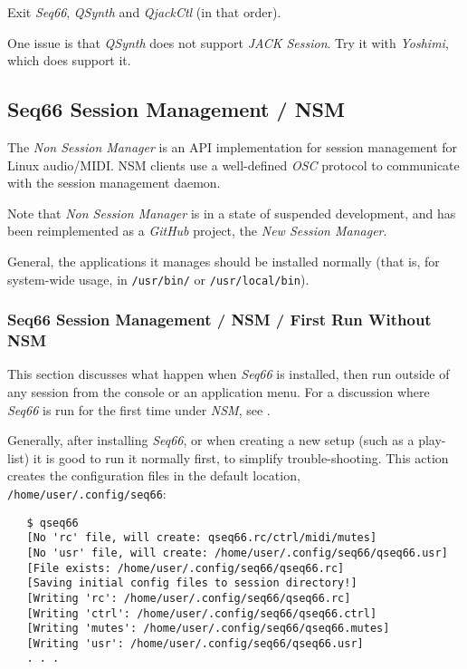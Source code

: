    Exit \textsl{Seq66}, \textsl{QSynth} and \textsl{QjackCtl}
   (in that order).

   One issue is that \textsl{QSynth}
   does not support \textsl{JACK Session}.
   Try it with \textsl{Yoshimi}, which does support it.


\subsection{Seq66 Session Management / NSM}
\label{subsec:sessions_nsm}

   The \textsl{Non Session Manager} is an API implementation for session
   management for Linux audio/MIDI. NSM clients use a well-defined
   \textsl{OSC} protocol to communicate with the session management daemon.

   Note that \textsl{Non Session Manager} is in a state of suspended
   development, and has been reimplemented as a \textsl{GitHub} project,
   the \textsl{New Session Manager}.

   General, the applications it manages should be installed normally (that is,
   for system-wide usage, in
   \texttt{/usr/bin/} or \texttt{/usr/local/bin}).

\subsubsection{Seq66 Session Management / NSM / First Run Without NSM}
\label{subsec:sessions_nsm_first_run_without_nsm}

   This section discusses what happen when \textsl{Seq66} is installed, then
   run outside of any session from the console or an application menu.
   For a discussion where \textsl{Seq66} is run for the first time under
   \textsl{NSM},
   see .

   Generally, after installing \textsl{Seq66}, or when creating a new setup
   (such as a play-list) it is good to run it normally first, to simplify
   trouble-shooting.
   This action creates the configuration files in the default location,
   \texttt{/home/user/.config/seq66}:

\begin{verbatim}
   $ qseq66 
   [No 'rc' file, will create: qseq66.rc/ctrl/midi/mutes]
   [No 'usr' file, will create: /home/user/.config/seq66/qseq66.usr]
   [File exists: /home/user/.config/seq66/qseq66.rc]
   [Saving initial config files to session directory!]
   [Writing 'rc': /home/user/.config/seq66/qseq66.rc]
   [Writing 'ctrl': /home/user/.config/seq66/qseq66.ctrl]
   [Writing 'mutes': /home/user/.config/seq66/qseq66.mutes]
   [Writing 'usr': /home/user/.config/seq66/qseq66.usr]
   . . .
\end{verbatim}

